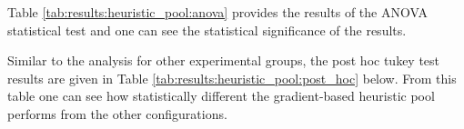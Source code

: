 Table \ref{tab:results:heuristic_pool:anova} provides the results of the ANOVA statistical test and one can see the statistical significance of the results.

\begin{table}[htbp]
      \centering
      \caption{ANOVA - Rank - BHH Variant: Heuristic Pool}
      \label{tab:results:heuristic_pool:anova}%
      \par\bigskip
\end{table}

Similar to the analysis for other experimental groups, the post hoc tukey test results are given in Table \ref{tab:results:heuristic_pool:post_hoc} below. From this table one can see how statistically different the gradient-based heuristic pool performs from the other configurations.

